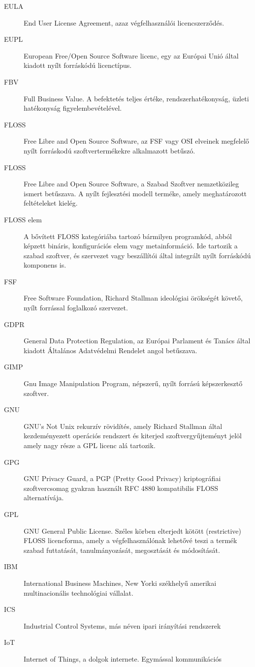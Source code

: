 \documentclass[12pt,magyar,a4paper,oneside]{scrreprt}
\begin{document}
\begin{description}
\item[EULA]
End User License Agreement, azaz végfelhasználói licencszerződés.
\item[EUPL]
European Free/Open Source Software licenc, egy az Európai Unió által
kiadott nyílt forráskódú licenctípus.
\item[FBV]
Full Business Value. A befektetés teljes értéke, rendszerhatékonyság,
üzleti hatékonyság figyelembevételével.
\item[FLOSS]
Free Libre and Open Source Software, az FSF vagy OSI elveinek megfelelő
nyílt forráskodú szoftvertermékekre alkalmazott betűszó.
\item[FLOSS]
Free Libre and Open Source Software, a Szabad Szoftver nemzetközileg
ismert betűszava. A nyílt fejlesztési modell terméke, amely
meghatározott feltételeket kielég.
\item[FLOSS elem]
A bővített FLOSS kategóriába tartozó bármilyen programkód, abból képzett
bináris, konfigurációs elem vagy metainformáció. Ide tartozik a szabad
szoftver, és szervezet vagy beszállítói által integrált nyílt forráskódú
komponens is.
\item[FSF]
Free Software Foundation, Richard Stallman ideológiai örökségét követő,
nyílt forrással foglalkozó szervezet.
\item[GDPR]
General Data Protection Regulation, az Európai Parlament és Tanács által
kiadott Általános Adatvédelmi Rendelet angol betűszava.
\item[GIMP]
Gnu Image Manipulation Program, népszerű, nyílt forrású képszerkesztő
szoftver.
\item[GNU]
GNU's Not Unix rekurzív rövidítés, amely Richard Stallman által
kezdeményezett operációs rendszert és kiterjed szoftvergyűjteményt jelöl
amely nagy része a GPL licenc alá tartozik.
\item[GPG]
GNU Privacy Guard, a PGP (Pretty Good Privacy) kriptográfiai
szoftvercsomag gyakran használt RFC 4880 kompatibilis FLOSS
alternatívája.
\item[GPL]
GNU General Public License. Széles körben elterjedt kötött (restrictive)
FLOSS licencforma, amely a végfelhasználónak lehetővé teszi a termék
szabad futtatását, tanulmányozását, megosztását és módosítását.
\item[IBM]
International Business Machines, New Yorki székhelyű amerikai
multinacionális technológiai vállalat.
\item[ICS]
Industrial Control Systems, más néven ipari irányítási rendszerek
\item[IoT]
Internet of Things, a dolgok internete. Egymással kommunikációs

\end{description}
\end{document}
